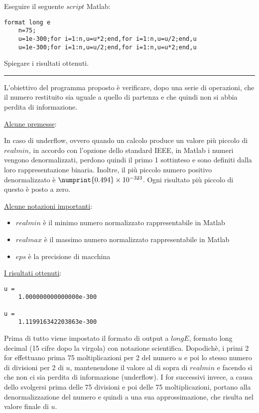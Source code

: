 Eseguire il seguente $script$ Matlab:
\begin{lstlisting}[caption = {}]
	format long e
	n=75;
	u=1e-300;for i=1:n,u=u*2;end,for i=1:n,u=u/2;end,u
	u=1e-300;for i=1:n,u=u/2;end,for i=1:n,u=u*2;end,u
\end{lstlisting}
Spiegare i risultati ottenuti.

\hspace*{\fill}
\par\noindent\rule{\textwidth}{0.4pt}
\hspace*{\fill}

L'obiettivo del programma proposto è verificare, dopo una serie di operazioni, che il numero restituito sia uguale a quello di partenza e
che quindi non si abbia perdita di informazione.

\underline{Alcune premesse}:

In caso di underflow, ovvero quando un calcolo produce un valore più piccolo di $realmin$, in accordo con l’opzione dello standard IEEE,
in Matlab i numeri vengono denormalizzati, perdono quindi il primo 1 sottinteso e sono definiti dalla loro rappresentazione binaria.
Inoltre, il più piccolo numero positivo denormalizzato è $\numprint{0.494}\times10^{-323}$. Ogni risultato più piccolo di questo è posto a zero.

\underline{Alcune notazioni importanti}:
\begin{itemize}
	\item $realmin$ è il minimo numero normalizzato rappresentabile in Matlab
	\item $realmax$ è il massimo numero normalizzato rappresentabile in Matlab
	\item $eps$ è la precisione di macchina
\end{itemize}

\underline{I risultati ottenuti}:
\begin{lstlisting}[caption = {}]
u =
	1.000000000000000e-300

u =
	1.119916342203863e-300
\end{lstlisting}

Prima di tutto viene impostato il formato di output a $longE$, formato long decimal (15 cifre dopo la virgola) con notazione scientifica.
Dopodichè, i primi 2 for effettuano prima 75 moltiplicazioni per 2 del numero $u$ e poi lo stesso numero di divisioni per 2 di $u$,
mantenendone il valore al di sopra di $realmin$ e facendo sì che non ci sia perdita di informazione (underflow).
I for successivi invece, a causa dello svolgersi prima delle 75 divisioni e poi delle 75 moltiplicazioni, portano alla denormalizzazione del numero e
quindi a una sua approssimazione, che risulta nel valore finale di $u$.

